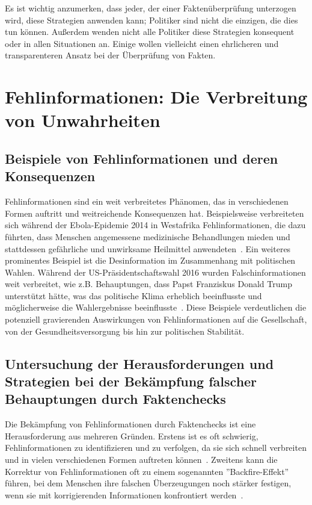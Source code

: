 \documentclass[a4paper,listof=totoc,bibliography=totoc]{scrartcl}
\begin{document}
Es ist wichtig anzumerken, dass jeder, der einer Faktenüberprüfung unterzogen wird, diese Strategien anwenden kann; Politiker sind nicht die einzigen, die dies tun können. 
Außerdem wenden nicht alle Politiker diese Strategien konsequent oder in allen Situationen an. Einige wollen vielleicht einen ehrlicheren und transparenteren Ansatz bei 
der Überprüfung von Fakten.

\section{Fehlinformationen: Die Verbreitung von Unwahrheiten}

\subsection{Beispiele von Fehlinformationen und deren Konsequenzen}

Fehlinformationen sind ein weit verbreitetes Phänomen, das in verschiedenen Formen auftritt und weitreichende Konsequenzen hat. Beispielsweise verbreiteten sich 
während der Ebola-Epidemie 2014 in Westafrika Fehlinformationen, die dazu führten, dass Menschen angemessene medizinische Behandlungen mieden und stattdessen gefährliche 
und unwirksame Heilmittel anwendeten~\cite{vinck2019}. 
Ein weiteres prominentes Beispiel ist die Desinformation im Zusammenhang mit politischen Wahlen. Während der US-Präsidentschaftswahl 2016 wurden Falschinformationen weit 
verbreitet, wie z.B. Behauptungen, dass Papst Franziskus Donald Trump unterstützt hätte, was das politische Klima erheblich beeinflusste und möglicherweise die Wahlergebnisse 
beeinflusste~\cite{allcott2017}.
Diese Beispiele verdeutlichen die potenziell gravierenden Auswirkungen von Fehlinformationen auf die Gesellschaft, von der Gesundheitsversorgung bis hin zur politischen Stabilität.

\subsection{Untersuchung der Herausforderungen und Strategien bei der Bekämpfung falscher Behauptungen durch Faktenchecks}

Die Bekämpfung von Fehlinformationen durch Faktenchecks ist eine Herausforderung aus mehreren Gründen. Erstens ist es oft schwierig, Fehlinformationen zu identifizieren 
und zu verfolgen, da sie sich schnell verbreiten und in vielen verschiedenen Formen auftreten können~\cite{lewandowsky2020}. 
Zweitens kann die Korrektur von Fehlinformationen oft zu einem sogenannten ''Backfire-Effekt'' führen, 
bei dem Menschen ihre falschen Überzeugungen noch stärker festigen, 
wenn sie mit korrigierenden Informationen konfrontiert werden~\cite{nyhan2010}. 
\end{document}
